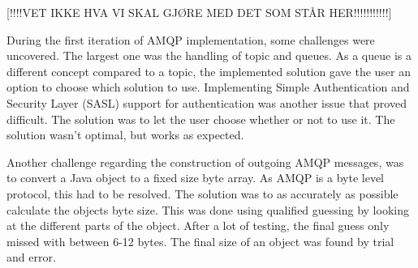 [!!!!VET IKKE HVA VI SKAL GJØRE MED DET SOM STÅR HER!!!!!!!!!!!]

During the first iteration of AMQP implementation, some challenges were uncovered. The largest one was the handling of topic and queues. As a queue is a different concept compared to a topic, the implemented solution gave the user an option to choose which solution to use. Implementing Simple Authentication and Security Layer (SASL) support for authentication was another issue that proved difficult. The solution was to let the user choose whether or not to use it. The solution wasn't optimal, but works as expected.

Another challenge regarding the construction of outgoing AMQP messages, was to convert a Java object to a fixed size byte array. As AMQP is a byte level protocol, this had to be resolved. The solution was to as accurately as possible calculate the objects byte size. This was done using qualified guessing by looking at the different parts of the object. After a lot of testing, the final guess only missed with between 6-12 bytes. The final size of an object was found by trial and error. 
